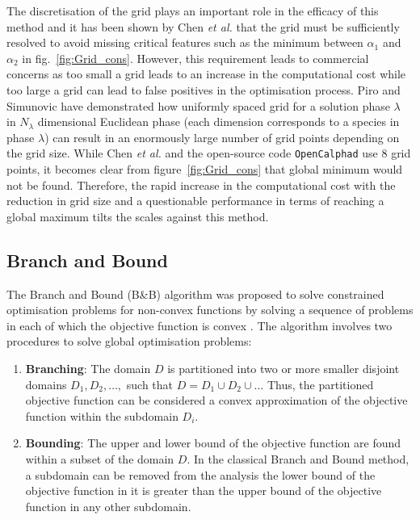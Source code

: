 The discretisation of the grid plays an important role in the efficacy of this method and it has been shown by Chen \textit{et al.} \cite{Chen93b} that the grid must be sufficiently resolved to avoid missing critical features such as the minimum between $\alpha_1$ and $\alpha_2$ in  fig.~\ref{fig:Grid_cons}.  However, this requirement leads to commercial concerns as too small a grid leads to an increase in the computational cost while too large a grid can lead to false positives in the optimisation process.  Piro and Simunovic \cite{Piro16} have demonstrated how uniformly spaced grid for a solution phase $\lambda$ in $N_\lambda$ dimensional Euclidean phase (each dimension corresponds to a species in phase $\lambda$) can result in an enormously large number of grid points depending on the grid size. While Chen \textit{et al.} \cite{Chen93a} and the open-source code \texttt{OpenCalphad} \cite{Sundman:2015aa} use 8 grid points, it becomes clear from figure~\ref{fig:Grid_cons} that global minimum would not be found. Therefore, the rapid increase in the computational cost with the reduction in grid size and a questionable performance in terms of reaching a global maximum tilts the scales against this method. 
	
	\subsection{Branch and Bound}
	The Branch and Bound (B\&B) algorithm was proposed to solve constrained optimisation problems for non-convex functions by solving a sequence of problems in each of which the objective function is convex \cite{Falk69}. The algorithm involves two procedures to solve global optimisation problems:
	\begin{enumerate}
		\item \textbf{Branching}: The domain $D$ is partitioned into two or more smaller disjoint domains $D_1,D_2,\dots,$ such that $D = D_1 \cup D_2 \cup \dots$ Thus, the partitioned objective function can be considered a convex approximation of the objective function within the subdomain $D_i$.
		\item \textbf{Bounding}: The upper and lower bound of the objective function are found within a subset of the domain $D$. In the classical Branch and Bound method, a subdomain can be removed from the analysis the lower bound of the objective function in it is greater than the upper bound of the objective function in any other subdomain.
	\end{enumerate}
	 
